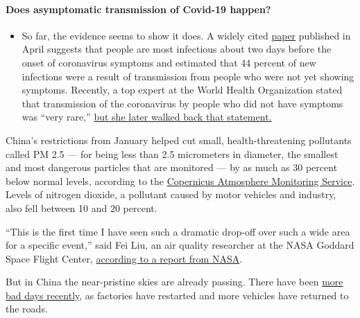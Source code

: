 \begin{itemize}
{  \paragraph{Does asymptomatic transmission of Covid-19
  happen?}\label{does-asymptomatic-transmission-of-covid-19-happen}}

  \begin{itemize}
  \tightlist
  \item
    So far, the evidence seems to show it does. A widely cited
    \href{https://www.nature.com/articles/s41591-020-0869-5}{paper}
    published in April suggests that people are most infectious about
    two days before the onset of coronavirus symptoms and estimated that
    44 percent of new infections were a result of transmission from
    people who were not yet showing symptoms. Recently, a top expert at
    the World Health Organization stated that transmission of the
    coronavirus by people who did not have symptoms was ``very rare,''
    \href{https://www.nytimes.com/2020/06/09/world/coronavirus-updates.html?action=click\&pgtype=Article\&state=default\&region=MAIN_CONTENT_3\&context=storylines_faq\#link-1f302e21}{but
    she later walked back that statement.}
  \end{itemize}
\end{itemize}

China's restrictions from January helped cut small, health-threatening
pollutants called PM 2.5 --- for being less than 2.5 micrometers in
diameter, the smallest and most dangerous particles that are monitored
--- by as much as 30 percent below normal levels, according to the
\href{https://atmosphere.copernicus.eu/amid-coronavirus-outbreak-copernicus-monitors-reduction-particulate-matter-pm25-over-china}{Copernicus
Atmosphere Monitoring Service}. Levels of nitrogen dioxide, a pollutant
caused by motor vehicles and industry, also fell between 10 and 20
percent.

``This is the first time I have seen such a dramatic drop-off over such
a wide area for a specific event,'' said Fei Liu, an air quality
researcher at the NASA Goddard Space Flight Center,
\href{https://earthobservatory.nasa.gov/images/146362/airborne-nitrogen-dioxide-plummets-over-china}{according
to a report from NASA}.

But in China the near-pristine skies are already passing. There have
been \href{https://aqicn.org/city/beijing/cn/}{more bad days recently},
as factories have restarted and more vehicles have returned to the
roads.

